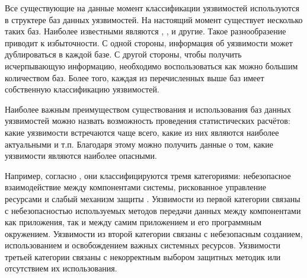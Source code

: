 %
Все существующие на данные момент классификации уязвимостей используются в структере баз данных 
уязвимостей.
%
На настоящий момент существует несколько таких баз. 
%
Наиболее известными являются  ,  
,   и другие. 
%
Такое разнообразение приводит к избыточности.
%
С одной стороны, информация об уязвимости может дублироваться в каждой базе.
%
С другой стороны, чтобы получить исчерпывающую информацию, необходимо воспользоваться как можно 
большим количеством баз.
%
Более того, каждая из перечисленных выше баз имеет собственную классификацию уязвимостей.

%
Наиболее важным преимуществом существования и использования баз данных уязвимостей можно назвать 
возможность проведения статистических расчётов: какие уязвимости встречаются чаще всего, какие из 
них являются наиболее актуальными и т.п.
%
Благодаря этому можно получить данные о том, какие уязвимости являются наиболее опасными. 

%
Например, согласно , они классифицируются тремя категориями: небезопасное 
взаимодействие между компонентами системы, рискованное управление ресурсами и слабый механизм 
защиты .
%
Уязвимости из первой категории связаны с небезопасностью используемых методов передачи данных между 
компонентами как приложения, так и между самим приложением и его программным окружением. 
%
Уязвимости из второй категории связаны с небезопасным созданием, использованием и освобождением 
важных системных ресурсов. 
%
Уязвимости третьей категории связаны с некорректным выбором защитных методик или отсутствием их 
использования.
